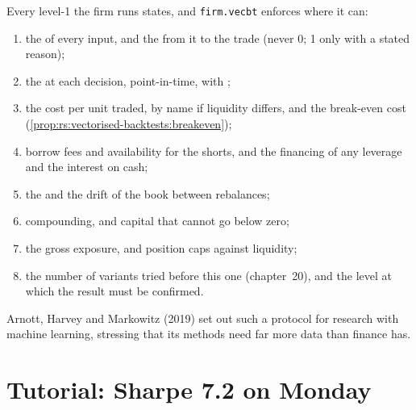 Every level-1  the firm runs states, and \texttt{firm.vecbt} enforces where it can:
\begin{enumerate}
\item the  of every input, and the  from it to the trade (never 0; 1 only with a stated reason);
\item the  at each decision, point-in-time, with ;
\item the cost per unit traded, by name if liquidity differs, and the break-even cost (\cref{prop:rs:vectorised-backtests:breakeven});
\item borrow fees and availability for the shorts, and the financing of any leverage and the interest on cash;
\item the  and the drift of the book between rebalances;
\item compounding, and capital that cannot go below zero;
\item the gross exposure, and position caps against liquidity;
\item the number of variants tried before this one (chapter~20), and the level at which the result must be confirmed.
\end{enumerate}
Arnott, Harvey and Markowitz (2019) set out such a protocol for research with machine learning, stressing that its methods need far more data than
finance has.

\section{Tutorial: Sharpe 7.2 on Monday}\label{tut:rs:vectorised-backtests:tut}

